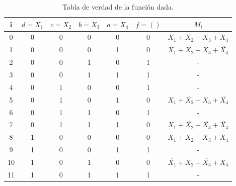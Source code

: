 \begin{table}[h!]
	\caption{Tabla de verdad de la función dada.}
	\begin{center}
		\begin{tabular}{|c|c|c|c|c|c|c|}
			\hline
			i  & $d=X_1$ & $c=X_2$ & $b=X_3$ & $a=X_4$ & $f=()$ & $M_i$                                                                          \\\hline
			0  & 0       & 0       & 0       & 0       & 0      & \(X_{1}+X_{2}+X_{3}+X_{4}\)                                                    \\ \hline
			1  & 0       & 0       & 0       & 1       & 0      & \(X_{1}+X_{2}+X_{3}+\overline{X_{4}}\)\Tstrut                                  \\ \hline
			2  & 0       & 0       & 1       & 0       & 1      & -                                                                              \\ \hline
			3  & 0       & 0       & 1       & 1       & 1      & -                                                                              \\ \hline
			4  & 0       & 1       & 0       & 0       & 1      & -                                                                              \\\hline
			5  & 0       & 1       & 0       & 1       & 0      & \(X_{1}+\overline{X_{2}}+X_{3}+\overline{X_{4}}\)\Tstrut                       \\ \hline
			6  & 0       & 1       & 1       & 0       & 1      & -                                                                              \\ \hline
			7  & 0       & 1       & 1       & 1       & 0      & \(X_{1}+\overline{X_{2}}+\overline{X_{3}}+\overline{X_{4}}\)\Tstrut            \\ \hline
			8  & 1       & 0       & 0       & 0       & 0      & \(\overline{X_{1}}+X_{2}+X_{3}+X_{4}\)\Tstrut                                  \\ \hline
			9  & 1       & 0       & 0       & 1       & 1      & -                                                                              \\ \hline
			10 & 1       & 0       & 1       & 0       & 0      & \(\overline{X_{1}}+X_{2}+\overline{X_{3}}+X_{4}\)\Tstrut                       \\ \hline
			11 & 1       & 0       & 1       & 1       & 1      & -                                                                              \\ \hline

\end{tabular}
\end{center}
\end{table}
